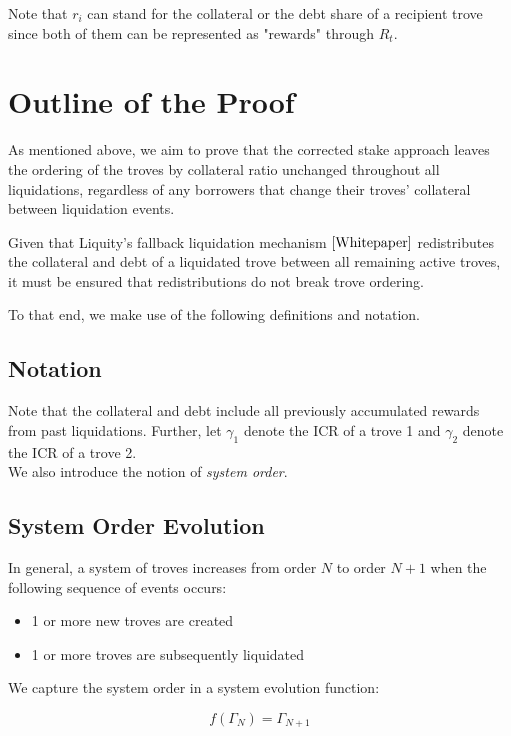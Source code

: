 \documentclass[reqno]{article}
\begin{document}
Note that $r_i$ can stand for the collateral or the debt share of a recipient trove since both of them can be represented as "rewards" through $R_t$.

\section{Outline of the Proof}
As mentioned above, we aim to prove that the corrected stake approach leaves the ordering of the troves by collateral ratio unchanged throughout all liquidations, regardless of any borrowers that change their troves' collateral between liquidation events.

Given that Liquity's fallback liquidation mechanism $\cite{Whitepaper}$ redistributes the collateral and debt of a liquidated trove between all remaining active troves, it must be  ensured that redistributions do not break trove ordering.

To that end, we make use of the following definitions and notation. 

\subsection{Notation}

Note that the collateral and debt include all previously accumulated rewards from past liquidations. Further, let $\gamma_1$ denote the ICR of a trove 1 and $\gamma_2$ denote the ICR of a trove 2. \\


We also introduce the notion of \textit{system order}. 

\subsection{System Order Evolution}
In general, a system of troves increases from order $N$ to order $N+1$ when the following sequence of events occurs:

\begin{itemize}
  \item 1 or more new troves are created 
  \item 1 or more troves are subsequently liquidated
\end{itemize}

We capture the system order in a system evolution function:

\begin{equation} 
    f(\Gamma_N)=\Gamma_{N+1}
\end{equation}
\end{document}
